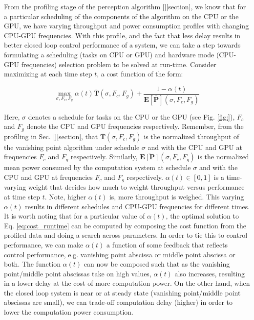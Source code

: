 
From the profiling stage of the perception algorithm \ref{}[section], we know that for a particular scheduling of the components of the algorithm on the CPU or the GPU, we have varying throughput and power consumption profiles with changing CPU-GPU frequencies. With this profile, and the fact that less delay results in better closed loop control performance of a system, we can take a step towards formulating a scheduling (tasks on CPU or GPU) and hardware mode (CPU-GPU frequencies) selection problem to be solved at run-time. Consider maximizing at each time step $t$, a cost function of the form:

\begin{equation}
\max_{\sigma,F_{c},F_{g}} \alpha(t)\mathbf{\bar{T}}(\sigma,F_{c},F_{g}) + \frac{1-\alpha(t)}{\mathbf{E[\bar{P}]}(\sigma,F_{c},F_{g})}
\label{eq:cost_runtime}
\end{equation}

Here, $\sigma$ denotes a schedule for tasks on the CPU or the GPU (see Fig. \ref{fig:}), $F_c$ and $F_g$ denote the CPU and GPU frequencies respectively. Remember, from the profiling in Sec. \ref{}[section], that $\mathbf{\bar{T}}(\sigma,F_{c},F_{g})$ is the normalized throughput of the vanishing point algorithm under schedule $\sigma$ and with the CPU and GPU at frequencies $F_c$ and $F_g$ respectively. Similarly, $\mathbf{\bar{E[P]}}(\sigma,F_{c},F_{g})$ is the normalized mean power consumed by the computation system at schedule $\sigma$ and with the CPU and GPU at frequencies $F_c$ and $F_g$ respectively. $\alpha(t) \in [0,1]$ is a time-varying weight that decides how much to weight throughput versus performance at time step $t$. Note, higher $\alpha(t)$ is, more throughput is weighed. This varying $\alpha(t)$ results in different schedules and CPU-GPU frequencies for different times. It is worth noting that for a particular value of $\alpha(t)$, the optimal solution to Eq. \ref{eq:cost_runtime} can be computed by composing the cost function from the profiled data and doing a search across parameters. In order to tie this to control performance, we can make $\alpha(t)$ a function of some feedback that reflects control performance, e.g. vanishing point abscissa or middle point abscissa or both. The function $\alpha(t)$ can now be composed such that as the vanishing point/middle point abscissas take on high values, $\alpha(t)$ also increases, resulting in a lower delay at the cost of more computation power. On the other hand, when the closed loop system is near or at steady state (vanishing point/middle point abscissas are small), we can trade-off computation delay (higher) in order to lower the computation power consumption. 